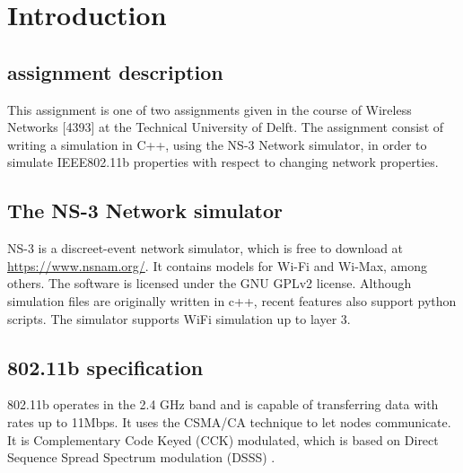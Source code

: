 \chapter{Introduction}

\section{assignment description} 

This assignment is one of two assignments given in the course of Wireless Networks [4393] at the Technical University of Delft. The assignment consist of writing a simulation in C++, using the NS-3 Network simulator, in order to simulate IEEE802.11b properties with respect to changing network properties. 

\section{The NS-3 Network simulator} 
NS-3 is a discreet-event network simulator, which is free to download at \url{https://www.nsnam.org/}. It contains models for Wi-Fi and Wi-Max, among others. The software is licensed under the GNU GPLv2 license. Although simulation files are  originally written in c++, recent features also support python scripts. The simulator supports WiFi simulation up to layer 3.   

\section{802.11b specification} 
802.11b operates in the 2.4 GHz band and is capable of transferring data with rates up to 11Mbps. It uses the CSMA/CA technique to let nodes communicate. It is Complementary Code Keyed (CCK) modulated, which is based on Direct Sequence Spread Spectrum modulation (DSSS) \cite{802.11b}.